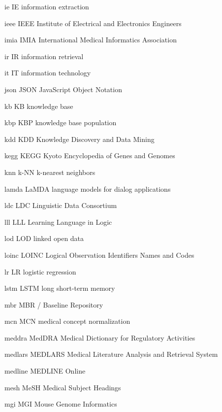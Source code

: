 \newabbreviation
{ie}
{IE}
{information extraction}

\newabbreviation
{ieee}
{IEEE}
{Institute of Electrical and Electronics Engineers}

\newabbreviation
{imia}
{IMIA}
{International Medical Informatics Association}

\newabbreviation
{ir}
{IR}
{information retrieval}

\newabbreviation
{it}
{IT}
{information technology}

\newabbreviation
{json}
{JSON}
{JavaScript Object Notation}

\newabbreviation
{kb}
{KB}
{knowledge base}

\newabbreviation
{kbp}
{KBP}
{knowledge base population}

\newabbreviation
{kdd}
{KDD}
{Knowledge Discovery and Data Mining}

\newabbreviation
{kegg}
{KEGG}
{Kyoto Encyclopedia of Genes and Genomes}

\newabbreviation
{knn}
{k-NN}
{k-nearest neighbors}

\newabbreviation
{lamda}
{LaMDA}
{language models for dialog applications}

\newabbreviation
{ldc}
{LDC}
{Linguistic Data Consortium}

\newabbreviation
{lll}
{LLL}
{Learning Language in Logic}

\newabbreviation
{lod}
{LOD}
{linked open data}

\newabbreviation
{loinc}
{LOINC}
{Logical Observation Identifiers Names and Codes}

\newabbreviation
{lr}
{LR}
{logistic regression}

\newabbreviation
{lstm}
{LSTM}
{long short-term memory}

\newabbreviation
{mbr}
{MBR}
{/ Baseline Repository}

\newabbreviation
{mcn}
{MCN}
{medical concept normalization}

\newabbreviation
{meddra}
{MedDRA}
{Medical Dictionary for Regulatory Activities}

\newabbreviation
{medlars}
{MEDLARS}
{Medical Literature Analysis and Retrieval System}

\newabbreviation
{medline}
{MEDLINE}
{ Online}

\newabbreviation
{mesh}
{MeSH}
{Medical Subject Headings}

\newabbreviation
{mgi}
{MGI}
{Mouse Genome Informatics}

